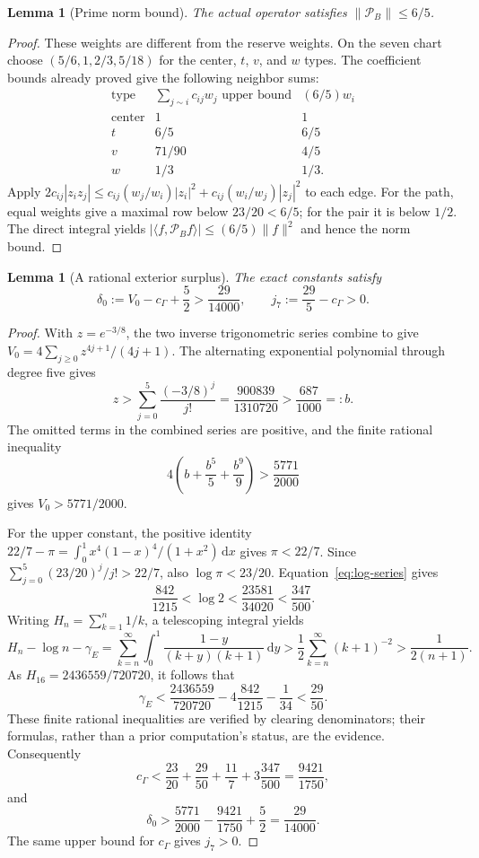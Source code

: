 \documentclass[11pt,a4paper]{article}
\newcommand{\ip}[2]{\langle #1,#2\rangle}
\newcommand{\norm}[1]{\lVert #1\rVert}
\newcommand{\Pp}{\mathcal P_B}
\newtheorem{lemma}[theorem]{Lemma}
\theoremstyle{remark}
\numberwithin{equation}{section}
\begin{document}
\begin{lemma}[Prime norm bound]\label{lem:prime-norm}
The actual operator satisfies $\norm{\Pp}\le6/5$.
\end{lemma}
\begin{proof}
These weights are different from the reserve weights. On the seven chart
choose $(5/6,1,2/3,5/18)$ for the center, $t$, $v$, and $w$ types.
The coefficient bounds already proved give the following neighbor sums:
\[
\begin{array}{c|c|c}
\text{type}&\sum_{j\sim i}c_{ij}w_j\text{ upper bound}&(6/5)w_i\\\hline
\text{center}&1&1\\
t&6/5&6/5\\
v&71/90&4/5\\
w&1/3&1/3.
\end{array}
\]
Apply $2c_{ij}|z_i z_j|\le
c_{ij}(w_j/w_i)|z_i|^2+c_{ij}(w_i/w_j)|z_j|^2$ to each edge.
For the path, equal weights give a maximal row below $23/20<6/5$;
for the pair it is below $1/2$. The direct integral yields
$|\ip{f}{\Pp f}|\le(6/5)\norm{f}^2$ and hence the norm bound.
\end{proof}

\begin{lemma}[A rational exterior surplus]\label{lem:delta}
The exact constants satisfy
\begin{equation}\label{eq:delta-bound}
 \delta_0:=V_0-c_\Gamma+\frac52>\frac{29}{14000},\qquad
 j_7:=\frac{29}{5}-c_\Gamma>0.
\end{equation}
\end{lemma}
\begin{proof}
With $z=e^{-3/8}$, the two inverse trigonometric series combine to give
$V_0=4\sum_{j\ge0}z^{4j+1}/(4j+1)$.
The alternating exponential polynomial through degree five gives
\[
 z>\sum_{j=0}^{5}\frac{(-3/8)^j}{j!}
   =\frac{900839}{1310720}>\frac{687}{1000}=:b.
\]
The omitted terms in the combined series are positive, and the finite
rational inequality
\[
 4\left(b+\frac{b^5}{5}+\frac{b^9}{9}\right)>\frac{5771}{2000}
\]
gives $V_0>5771/2000$.

For the upper constant, the positive identity
$22/7-\pi=\int_0^1 x^4(1-x)^4/(1+x^2)\,\mathrm dx$ gives $\pi<22/7$.
Since $\sum_{j=0}^{5}(23/20)^j/j!>22/7$, also $\log\pi<23/20$.
Equation~\eqref{eq:log-series} gives
\[
 \frac{842}{1215}<\log2<\frac{23581}{34020}<\frac{347}{500}.
\]
Writing $H_n=\sum_{k=1}^n1/k$, a telescoping integral yields
\[
 H_n-\log n-\gamma_E
 =\sum_{k=n}^\infty\int_0^1
   \frac{1-y}{(k+y)(k+1)}\,\mathrm dy
 >\frac12\sum_{k=n}^\infty(k+1)^{-2}>\frac1{2(n+1)}.
\]
As $H_{16}=2436559/720720$, it follows that
\[
 \gamma_E<\frac{2436559}{720720}
              -4\frac{842}{1215}-\frac1{34}<\frac{29}{50}.
\]
These finite rational inequalities are verified by clearing denominators;
their formulas, rather than a prior computation's status, are the evidence.
Consequently
\[
 c_\Gamma<\frac{23}{20}+\frac{29}{50}+\frac{11}{7}
                         +3\frac{347}{500}=\frac{9421}{1750},
\]
and
\[
 \delta_0>\frac{5771}{2000}-\frac{9421}{1750}+\frac52
           =\frac{29}{14000}.
\]
The same upper bound for $c_\Gamma$ gives $j_7>0$.
\end{proof}
\end{document}
